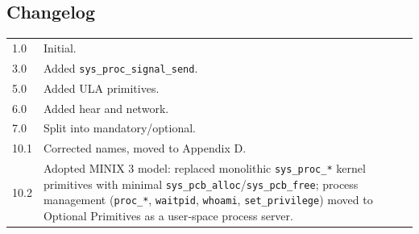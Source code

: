 \documentclass[12pt,a4paper]{article}
\begin{document}
\subsection{Changelog}
\begin{tabularx}{\textwidth}{|l|X|}
\hline
1.0 & Initial. \\
3.0 & Added \texttt{sys\_proc\_signal\_send}. \\
5.0 & Added ULA primitives. \\
6.0 & Added hear and network. \\
7.0 & Split into mandatory/optional. \\
10.1 & Corrected names, moved to Appendix D. \\
10.2 & Adopted MINIX 3 model: replaced monolithic \texttt{sys\_proc\_*} kernel primitives with minimal \texttt{sys\_pcb\_alloc}/\texttt{sys\_pcb\_free}; process management (\texttt{proc\_*}, \texttt{waitpid}, \texttt{whoami}, \texttt{set\_privilege}) moved to Optional Primitives as a user‑space process server. \\
\hline
\end{tabularx}
\end{document}
